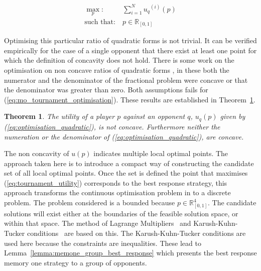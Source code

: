 \documentclass[10pt]{article}
\newcommand{\R}{\mathbb{R}}
\newtheorem{theorem}{Theorem}
\begin{document}
\begin{equation}\label{eq:mo_tournament_optimisation}
    \begin{aligned}
    \max_p: & \ \sum_{i=1} ^ {N} {u_q}^{(i)} (p)
    \\
    \text{such that}: & \ p \in \R_{[0, 1]}
    \end{aligned}
\end{equation}

Optimising this particular ratio of quadratic forms is not trivial. It can be
verified empirically for the case of a single opponent that there exist at least
one point for which the definition of concavity does not hold. There is some
work on the optimisation on non concave ratios of quadratic forms
\cite{Beck2009, Hongyan2014}, in these both the numerator and the denominator of
the fractional problem were concave or that the denominator was greater than
zero. Both assumptions fails for (\ref{eq:mo_tournament_optimisation}). These
results are established in Theorem~\ref{theorem:concavity}.

\begin{theorem}\label{theorem:concavity}
    The utility of a player \(p\) against an opponent \(q\), \(u_q (p)\) given by
    (\ref{eq:optimisation_quadratic}), is not concave. Furthermore neither the
    numeration or the denominator of (\ref{eq:optimisation_quadratic}), are concave.
\end{theorem}

The non concavity of \(u(p)\) indicates multiple local optimal points. The
approach taken here is to introduce a compact way of constructing the candidate
set of all local optimal points. Once the set is defined the point that
maximises (\ref{eq:tournament_utility}) corresponds to the best response
strategy, this approach transforms the continuous optimisation problem in to a
discrete problem. The problem considered is a bounded because \(p \in \R^4_{[0,
1]}\). The candidate solutions will exist either at the boundaries of the
feasible solution space, or within that space. The method of Lagrange
Multipliers~\cite{bertsekas2014} and Karush-Kuhn-Tucker
conditions~\cite{Giorgi2016} are based on this. The Karush-Kuhn-Tucker
conditions are used here because the constraints are inequalities.
These lead to Lemma~\ref{lemma:memone_group_best_response} which
presents the best response memory one strategy to a group of opponents.
\end{document}

